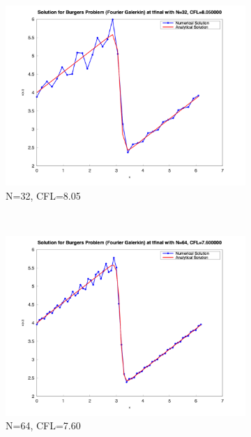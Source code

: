 \begin{figure}[H]
	\centering
	\begin{subfigure}{0.5\textwidth}
		\includegraphics[width=\textwidth]{media/burger_tfinal_fg_32.png}
		\caption{N=32, CFL=8.05}
		\label{sfig:galerkin_n32}
	\end{subfigure}%
	~
	\begin{subfigure}{0.5\textwidth}
		\includegraphics[width=\textwidth]{media/burger_tfinal_fg_64.png}
		\caption{N=64, CFL=7.60}
		\label{sfig:galerkin_n64}
	\end{subfigure}\\
	\begin{subfigure}{0.5\textwidth}

\end{subfigure}
\end{figure}
